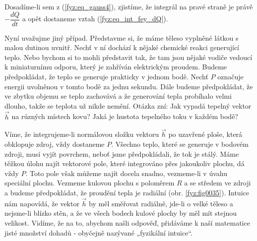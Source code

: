       Dosadíme-li sem z (\ref{fyz:eq_gauss4}), zjistíme, že integrál na pravé straně je právě
      \(-\dfrac{dQ}{dt}\) a opět dostaneme vztah (\ref{fyz:eq_int_fey_dQ}).
      
      Nyní uvažujme jiný případ. Představme si, že máme těleso vyplněné látkou s malou dutinou 
      uvnitř. Nechť v ní dochází k nějaké chemické reakci generující teplo. Nebo bychom si to mohli 
      představit tak, že tam jsou nějaké vodiče vedoucí k miniaturnímu odporu, který je zahříván 
      elektrickým proudem. Budeme předpokládat, že teplo se generuje prakticky v jednom bodě. Nechť 
      \(P\) označuje energii uvolněnou v tomto bodě za jednu sekundu. Dále budeme předpokládat, že 
      ve zbytku objemu se teplo zachovává a že generování tepla probíhalo velmi dlouho, takže se 
      teplota už nikde nemění. Otázka zní: Jak vypadá tepelný vektor \(\vec{h}\) na různých místech 
      kovu? Jaká je hustota tepelného toku v každém bodě?
      
      Víme, že integrujeme-li normálovou složku vektoru \(\vec{h}\) po uzavřené ploše, která 
      obklopuje zdroj, vždy dostaneme \(P\). Všechno teplo, které se generuje v bodovém zdroji, 
      musí vyjít povrchem, neboť jsme předpokládali, že tok je stálý. Máme těžkou úlohu najít 
      vektorové pole, které integrováno přes jakoukoliv plochu, dá vždy \(P\). Toto pole však 
      můžeme najít docela snadno, vezmeme-li v úvahu speciální plochu. Vezmeme kulovou plochu s 
      poloměrem \(R\) a se středem ve zdroji a budeme předpokládat, že proudění tepla je radiální 
      (obr. \ref{fyz:fig0035}). Intuice nám napovídá, že vektor \(\vec{h}\) by měl 
      směřovat radiálně, jde-li o velké těleso a nejsme-li blízko stěn, a že ve všech bodech kulové 
      plochy by měl mít stejnou velikost. Vidíme, že na to, abychom našli odpověď, přidáváme k naší 
      matematice jisté množství dohadů - obyčejně nazývané „fyzikální intuice“.

